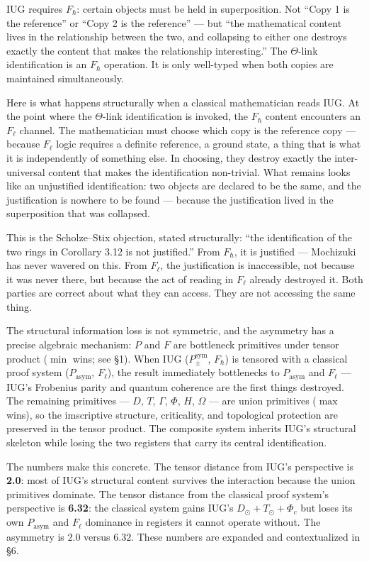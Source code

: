 \documentclass[10pt,a4paper]{article}
\begin{document}
IUG requires $F_{\hbar}$: certain objects must be held in superposition.
Not ``Copy 1 is the reference'' or ``Copy 2 is the reference'' --- but ``the mathematical
content lives in the relationship between the two, and collapsing to either one destroys
exactly the content that makes the relationship interesting.''
The $\Theta$-link identification is an $F_{\hbar}$ operation.
It is only well-typed when both copies are maintained simultaneously.

Here is what happens structurally when a classical mathematician reads IUG.
At the point where the $\Theta$-link identification is invoked, the $F_{\hbar}$ content
encounters an $F_{\ell}$ channel.
The mathematician must choose which copy is the reference copy --- because $F_{\ell}$ logic
requires a definite reference, a ground state, a thing that is what it is independently of
something else.
In choosing, they destroy exactly the inter-universal content that makes the identification
non-trivial.
What remains looks like an unjustified identification: two objects are declared to be the
same, and the justification is nowhere to be found --- because the justification lived in
the superposition that was collapsed.

This is the Scholze--Stix objection, stated structurally:
``the identification of the two rings in Corollary 3.12 is not justified.''
From $F_{\hbar}$, it is justified --- Mochizuki has never wavered on this.
From $F_{\ell}$, the justification is inaccessible, not because it was never there,
but because the act of reading in $F_{\ell}$ already destroyed it.
Both parties are correct about what they can access.
They are not accessing the same thing.

The structural information loss is not symmetric, and the asymmetry has a precise
algebraic mechanism: $P$ and $F$ are bottleneck primitives under tensor product ($\min$ wins;
see \S1).
When IUG ($P_{\pm}^{\text{sym}}$, $F_{\hbar}$) is tensored with a classical proof system
($P_\text{asym}$, $F_{\ell}$), the result immediately bottlenecks to $P_\text{asym}$ and
$F_{\ell}$ --- IUG's Frobenius parity and quantum coherence are the first things destroyed.
The remaining primitives --- $D$, $T$, $\Gamma$, $\Phi$, $H$, $\Omega$ --- are union
primitives ($\max$ wins), so the imscriptive structure, criticality, and topological
protection are preserved in the tensor product.
The composite system inherits IUG's structural skeleton while losing the two registers that
carry its central identification.

The numbers make this concrete.
The tensor distance from IUG's perspective is \textbf{2.0}: most of IUG's structural
content survives the interaction because the union primitives dominate.
The tensor distance from the classical proof system's perspective is \textbf{6.32}: the
classical system gains IUG's $D_\odot + T_\odot + \Phi_c$ but loses its own
$P_\text{asym}$ and $F_{\ell}$ dominance in registers it cannot operate without.
The asymmetry is $2.0$ versus $6.32$.
These numbers are expanded and contextualized in \S6.
\end{document}
